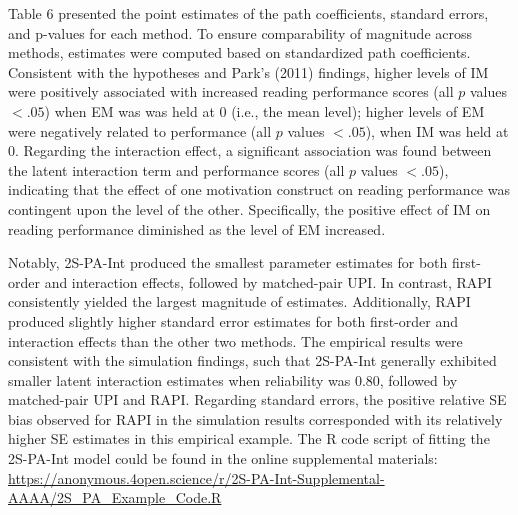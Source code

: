 \documentclass[
  man]{apa6}
\begin{document}
Table 6 presented the point estimates of the path coefficients, standard errors, and p-values for each method. To ensure comparability of magnitude across methods, estimates were computed based on standardized path coefficients. Consistent with the hypotheses and Park's (2011) findings, higher levels of IM were positively associated with increased reading performance scores (all \(\textit{p}\) values \(< .05\)) when EM was was held at 0 (i.e., the mean level); higher levels of EM were negatively related to performance (all \(\textit{p}\) values \(< .05\)), when IM was held at 0. Regarding the interaction effect, a significant association was found between the latent interaction term and performance scores (all \(\textit{p}\) values \(< .05\)), indicating that the effect of one motivation construct on reading performance was contingent upon the level of the other. Specifically, the positive effect of IM on reading performance diminished as the level of EM increased.

Notably, 2S-PA-Int produced the smallest parameter estimates for both first-order and interaction effects, followed by matched-pair UPI. In contrast, RAPI consistently yielded the largest magnitude of estimates. Additionally, RAPI produced slightly higher standard error estimates for both first-order and interaction effects than the other two methods. The empirical results were consistent with the simulation findings, such that 2S-PA-Int generally exhibited smaller latent interaction estimates when reliability was 0.80, followed by matched-pair UPI and RAPI. Regarding standard errors, the positive relative SE bias observed for RAPI in the simulation results corresponded with its relatively higher SE estimates in this empirical example. The R code script of fitting the 2S-PA-Int model could be found in the online supplemental materials: \url{https://anonymous.4open.science/r/2S-PA-Int-Supplemental-AAAA/2S_PA_Example_Code.R}
\end{document}
